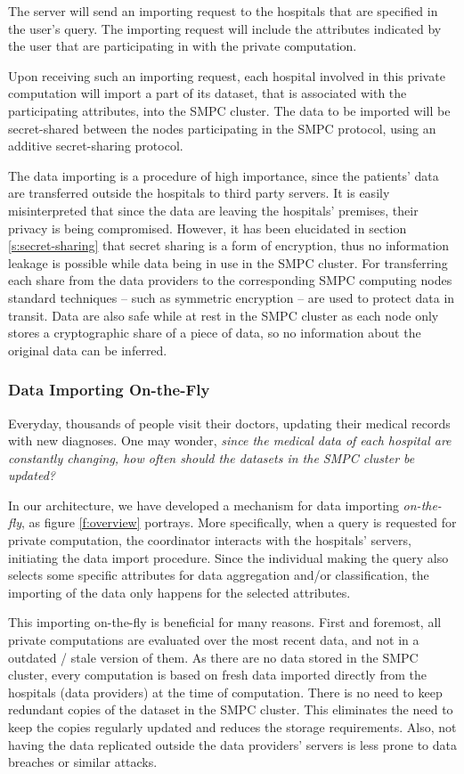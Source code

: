 The server will send an importing request to the hospitals that are specified in the user's query.
The importing request will include the attributes indicated by the user that are participating in with the private computation.

Upon receiving such an importing request, each hospital involved in this private computation will import a part of its dataset, that is associated with the participating attributes, into the SMPC cluster.
The data to be imported will be secret\hyp shared between the nodes participating in the SMPC protocol, using an additive secret\hyp sharing protocol.

The data importing is a procedure of high importance, since the patients' data are transferred outside the hospitals to third party servers.
It is easily misinterpreted that since the data are leaving the hospitals' premises, their privacy is being compromised.
However, it has been elucidated in section \ref{s:secret-sharing} that secret sharing is a form of encryption, thus no information leakage is possible while data being in use in the SMPC cluster.
For transferring each share from the data providers to the corresponding SMPC computing nodes standard techniques -- such as symmetric encryption -- are used to protect data in transit.
Data are also safe while at rest in the SMPC cluster as each node only stores a cryptographic share of a piece of data, so no information about the original data can be inferred.

\subsubsection{Data Importing On-the-Fly}\label{sss:importing-otf}
Everyday, thousands of people visit their doctors, updating their medical records with new diagnoses.
One may wonder, \textit{since the medical data of each hospital are constantly changing, how often should the datasets in the SMPC cluster be updated?}

In our architecture, we have developed a mechanism for data importing \textit{on-the-fly}, as figure \ref{f:overview} portrays.
More specifically, when a query is requested for private computation, the coordinator interacts with the hospitals' servers, initiating the data import procedure.
Since the individual making the query also selects some specific attributes for data aggregation and/or classification, the importing of the data only happens for the selected attributes.

This importing on-the-fly is beneficial for many reasons.
First and foremost, all private computations are evaluated over the most recent data, and not in a outdated / stale version of them.
As there are no data stored in the SMPC cluster, every computation is based on fresh data imported directly from the hospitals (data providers) at the time of computation.
There is no need to keep redundant copies of the dataset in the SMPC cluster.
This eliminates the need to keep the copies regularly updated and reduces the storage requirements.
Also, not having the data replicated outside the data providers' servers is less prone to data breaches or similar attacks.

